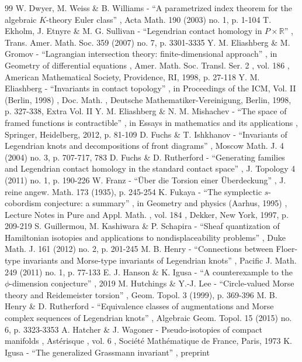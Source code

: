 \documentclass[11pt]{article}
\numberwithin{equation}{section}\providecommand{\dpl}{\displaystyle}
\begin{document}
\begin{thebibliography}{99}
 W. Dwyer, M. Weiss \& B. Williams - “A parametrized index theorem for the algebraic $K$-theory Euler class” , Acta Math. 190 (2003) no. 1, p. 1-104
 T. Ekholm, J. Etnyre \& M. G. Sullivan - “Legendrian contact homology in $P\times \mathbb{R}$” , Trans. Amer. Math. Soc. 359 (2007) no. 7, p. 3301-3335
 Y. M. Eliashberg \& M. Gromov - “Lagrangian intersection theory: finite-dimensional approach” , in Geometry of differential equations , Amer. Math. Soc. Transl. Ser. 2 , vol. 186 , American Mathematical Society, Providence, RI, 1998, p. 27-118
 Y. M. Eliashberg - “Invariants in contact topology” , in Proceedings of the ICM, Vol. II (Berlin, 1998) , Doc. Math. , Deutsche Mathematiker-Vereinigung, Berlin, 1998, p. 327-338, Extra Vol. II
 Y. M. Eliashberg \& N. M. Mishachev - “The space of framed functions is contractible” , in Essays in mathematics and its applications , Springer, Heidelberg, 2012, p. 81-109
 D. Fuchs \& T. Ishkhanov - “Invariants of Legendrian knots and decompositions of front diagrams” , Moscow Math. J. 4 (2004) no. 3, p. 707-717, 783
 D. Fuchs \& D. Rutherford - “Generating families and Legendrian contact homology in the standard contact space” , J. Topology 4 (2011) no. 1, p. 190-226
 W. Franz - “Über die Torsion einer Überdeckung” , J. reine angew. Math. 173 (1935), p. 245-254
 K. Fukaya - “The symplectic $s$-cobordism conjecture: a summary” , in Geometry and physics (Aarhus, 1995) , Lecture Notes in Pure and Appl. Math. , vol. 184 , Dekker, New York, 1997, p. 209-219
 S. Guillermou, M. Kashiwara \& P. Schapira - “Sheaf quantization of Hamiltonian isotopies and applications to nondisplaceability problems” , Duke Math. J. 161 (2012) no. 2, p. 201-245
 M. B. Henry - “Connections between Floer-type invariants and Morse-type invariants of Legendrian knots” , Pacific J. Math. 249 (2011) no. 1, p. 77-133
 E. J. Hanson \& K. Igusa - “A counterexample to the $\phi $-dimension conjecture” , 2019
 M. Hutchings \& Y.-J. Lee - “Circle-valued Morse theory and Reidemeister torsion” , Geom. Topol. 3 (1999), p. 369-396
 M. B. Henry \& D. Rutherford - “Equivalence classes of augmentations and Morse complex sequences of Legendrian knots” , Algebraic Geom. Topol. 15 (2015) no. 6, p. 3323-3353
 A. Hatcher \& J. Wagoner - Pseudo-isotopies of compact manifolds , Astérisque , vol. 6 , Société Mathématique de France, Paris, 1973
 K. Igusa - “The generalized Grassmann invariant” , preprint

\end{thebibliography}
\end{document}
